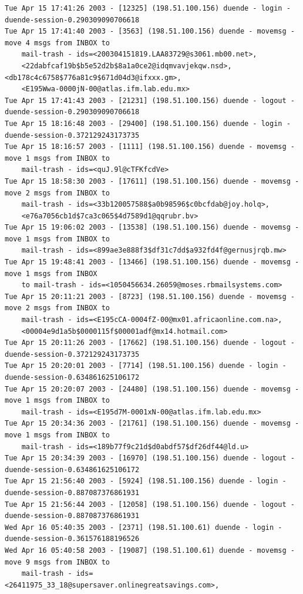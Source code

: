 \begin{lstlisting}[style=terminal]
Tue Apr 15 17:41:26 2003 - [12325] (198.51.100.156) duende - login - duende-session-0.290309090706618
Tue Apr 15 17:41:40 2003 - [3563] (198.51.100.156) duende - movemsg - move 4 msgs from INBOX to 
    mail-trash - ids=<200304151819.LAA83729@s3061.mb00.net>, 
    <22dabfcaf19b$b5e52d2b$8a1a0ce2@idqmvavjekqw.nsd>, <db178c4c6758$776a81c9$671d04d3@ifxxx.gm>, 
    <E195Wwa-0000jN-00@atlas.ifm.lab.edu.mx>
Tue Apr 15 17:41:43 2003 - [21231] (198.51.100.156) duende - logout - duende-session-0.290309090706618
Tue Apr 15 18:16:48 2003 - [29400] (198.51.100.156) duende - login - duende-session-0.372129243173735
Tue Apr 15 18:16:57 2003 - [1111] (198.51.100.156) duende - movemsg - move 1 msgs from INBOX to 
    mail-trash - ids=<quJ.9l@cTFKfcdVe>
Tue Apr 15 18:58:30 2003 - [17611] (198.51.100.156) duende - movemsg - move 2 msgs from INBOX to 
    mail-trash - ids=<33b120057588$a0b98596$c0bcfdab@joy.holq>, 
    <e76a7056cb1d$7ca3c065$4d7589d1@qqrubr.bv>
Tue Apr 15 19:06:02 2003 - [13538] (198.51.100.156) duende - movemsg - move 1 msgs from INBOX to 
    mail-trash - ids=<899ae3e888f3$df31c7dd$a932fd4f@gernusjrqb.mw>
Tue Apr 15 19:48:41 2003 - [13466] (198.51.100.156) duende - movemsg - move 1 msgs from INBOX 
    to mail-trash - ids=<1050456634.26059@moses.rbmailsystems.com>
Tue Apr 15 20:11:21 2003 - [8723] (198.51.100.156) duende - movemsg - move 2 msgs from INBOX to 
    mail-trash - ids=<E195cCA-0004fZ-00@mx01.africaonline.com.na>, 
    <00004e9d1a5b$0000115f$00001adf@mx14.hotmail.com>
Tue Apr 15 20:11:26 2003 - [17662] (198.51.100.156) duende - logout - duende-session-0.372129243173735
Tue Apr 15 20:20:01 2003 - [7714] (198.51.100.156) duende - login - duende-session-0.634861625106172
Tue Apr 15 20:20:07 2003 - [24480] (198.51.100.156) duende - movemsg - move 1 msgs from INBOX to 
    mail-trash - ids=<E195d7M-0001xN-00@atlas.ifm.lab.edu.mx>
Tue Apr 15 20:34:36 2003 - [21761] (198.51.100.156) duende - movemsg - move 1 msgs from INBOX to 
    mail-trash - ids=<189b77f9c21d$d0abdf57$df26df44@ld.u>
Tue Apr 15 20:34:39 2003 - [16970] (198.51.100.156) duende - logout - duende-session-0.634861625106172
Tue Apr 15 21:56:40 2003 - [5924] (198.51.100.156) duende - login - duende-session-0.887087376861931
Tue Apr 15 21:56:44 2003 - [12058] (198.51.100.156) duende - logout - duende-session-0.887087376861931
Wed Apr 16 05:40:35 2003 - [2371] (198.51.100.61) duende - login - duende-session-0.361576188196526
Wed Apr 16 05:40:58 2003 - [19087] (198.51.100.61) duende - movemsg - move 9 msgs from INBOX to 
    mail-trash - ids=<26411975_33_18@supersaver.onlinegreatsavings.com>, 

\end{lstlisting}
